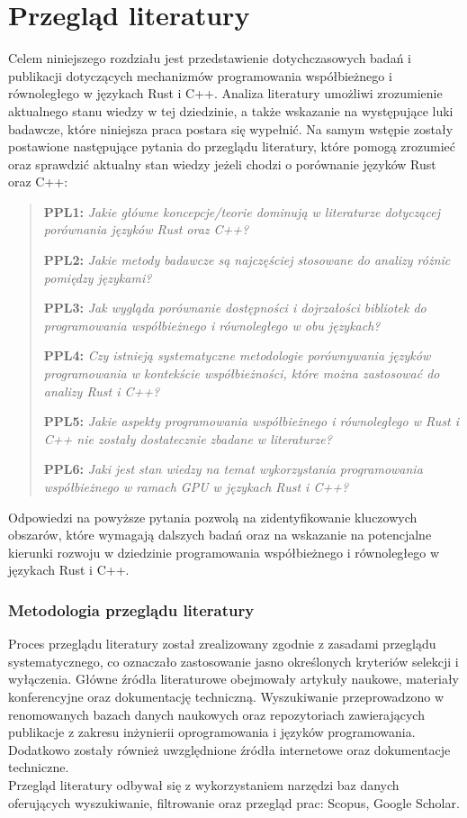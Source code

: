 \chapter{Przegląd literatury}
Celem niniejszego rozdziału jest przedstawienie dotychczasowych badań i publikacji dotyczących mechanizmów programowania współbieżnego i równoległego w językach Rust i C++. Analiza literatury umożliwi zrozumienie aktualnego stanu wiedzy w tej dziedzinie, a także wskazanie na występujące luki badawcze, które niniejsza praca postara się wypełnić.
Na samym wstępie zostały postawione następujące pytania do przeglądu literatury, które pomogą zrozumieć oraz sprawdzić aktualny stan wiedzy jeżeli chodzi o porównanie języków Rust oraz C++:

\begin{quote}
    \item \textbf{PPL1:} \emph{Jakie główne koncepcje/teorie dominują w literaturze dotyczącej porównania języków Rust oraz C++?} \label{PPL1}
    \item \textbf{PPL2:} \emph{Jakie metody badawcze są najczęściej stosowane do analizy różnic pomiędzy językami?}
    \item \textbf{PPL3:} \emph{Jak wygląda porównanie dostępności i dojrzałości bibliotek do programowania współbieżnego i równoległego w obu językach?}
    \item \textbf{PPL4:} \emph{Czy istnieją systematyczne metodologie porównywania języków programowania w kontekście współbieżności, które można zastosować do analizy Rust i C++?}
    \item \textbf{PPL5:} \emph{Jakie aspekty programowania współbieżnego i równoległego w Rust i C++ nie zostały dostatecznie zbadane w literaturze?}
    \item \textbf{PPL6:} \emph{Jaki jest stan wiedzy na temat wykorzystania programowania współbieżnego w ramach GPU w językach Rust i C++?}
\end{quote}

Odpowiedzi na powyższe pytania pozwolą na zidentyfikowanie kluczowych obszarów, które wymagają dalszych badań oraz na wskazanie na potencjalne kierunki rozwoju w dziedzinie programowania współbieżnego i równoległego w językach Rust i C++.\\
\subsection{Metodologia przeglądu literatury}
Proces przeglądu literatury został zrealizowany zgodnie z zasadami przeglądu systematycznego, co oznaczało zastosowanie jasno określonych kryteriów selekcji i wyłączenia. Główne źródła literaturowe obejmowały artykuły naukowe, materiały konferencyjne oraz dokumentację techniczną. Wyszukiwanie przeprowadzono w renomowanych bazach danych naukowych oraz repozytoriach zawierających publikacje z zakresu inżynierii oprogramowania i języków programowania. Dodatkowo zostały również uwzględnione źródła internetowe oraz dokumentacje techniczne.\\
Przegląd literatury odbywał się z wykorzystaniem narzędzi baz danych oferujących wyszukiwanie, filtrowanie oraz przegląd prac: Scopus, Google Scholar.\\
